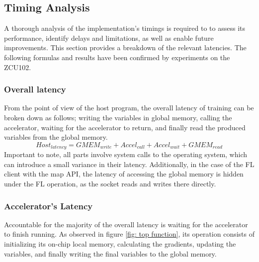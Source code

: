 \subsection{Timing Analysis}
A thorough analysis of the implementation's timings is required to to assess its performance, identify delays and limitations, as well as enable future improvements. This section provides a breakdown of the relevant latencies. The following formulas and results have been confirmed by experiments on the ZCU102. %

\subsubsection{Overall latency}
From the point of view of the host program, the overall latency of training can be broken down as follows; writing the variables in global memory, calling the accelerator, waiting for the accelerator to return, and finally read the produced variables from the global memory. %
\begin{equation}
	Host_{latency} = GMEM_{write} + Accel_{call} + Accel_{wait} + GMEM_{read}
	\label{eqn: host program, training latency}
\end{equation}
Important to note, all parts involve system calls to the operating system, which can introduce a small variance in their latency. Additionally, in the case of the FL client with the map API, the latency of accessing the global memory is hidden under the FL operation, as the socket reads and writes there directly. %

\subsubsection{Accelerator's Latency}
Accountable for the majority of the overall latency is waiting for the accelerator to finish running. As observed in figure \ref{fig: top function}, its operation consists of initializing its on-chip local memory, calculating the gradients, updating the variables, and finally writing the final variables to the global memory. %

